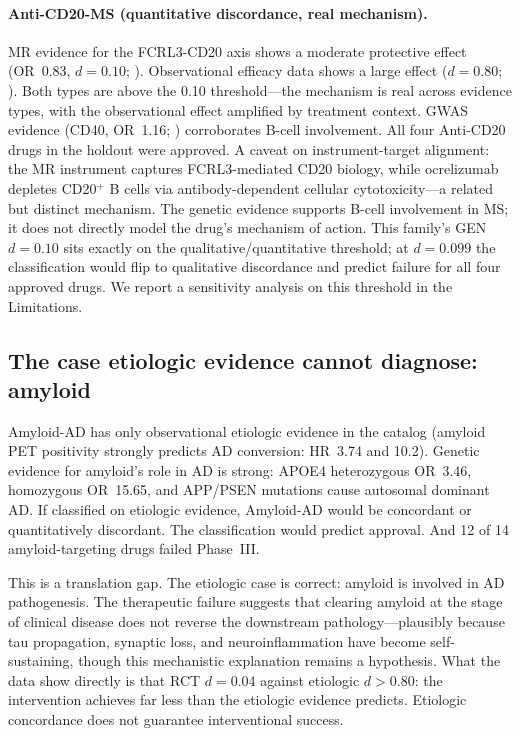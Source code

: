 \documentclass[11pt]{article}
\begin{document}
\paragraph{Anti-CD20-MS (quantitative discordance, real mechanism).} MR evidence for the FCRL3-CD20 axis shows a moderate protective effect (OR~0.83, $d = 0.10$; \citealp{lin2023}). Observational efficacy data shows a large effect ($d = 0.80$; \citealp{hu2019}). Both types are above the 0.10 threshold---the mechanism is real across evidence types, with the observational effect amplified by treatment context. GWAS evidence (CD40, OR~1.16; \citealp{sokolova2013}) corroborates B-cell involvement. All four Anti-CD20 drugs in the holdout were approved. A caveat on instrument-target alignment: the MR instrument captures FCRL3-mediated CD20 biology, while ocrelizumab depletes CD20$^+$ B cells via antibody-dependent cellular cytotoxicity---a related but distinct mechanism. The genetic evidence supports B-cell involvement in MS; it does not directly model the drug's mechanism of action. This family's GEN $d = 0.10$ sits exactly on the qualitative/quantitative threshold; at $d = 0.099$ the classification would flip to qualitative discordance and predict failure for all four approved drugs. We report a sensitivity analysis on this threshold in the Limitations.

\subsection{The case etiologic evidence cannot diagnose: amyloid}
\label{sec:amyloid}

Amyloid-AD has only observational etiologic evidence in the catalog (amyloid PET positivity strongly predicts AD conversion: HR~3.74 and 10.2). Genetic evidence for amyloid's role in AD is strong: APOE4 heterozygous OR~3.46, homozygous OR~15.65, and APP/PSEN mutations cause autosomal dominant AD. If classified on etiologic evidence, Amyloid-AD would be concordant or quantitatively discordant. The classification would predict approval. And 12 of 14 amyloid-targeting drugs failed Phase~III.

This is a translation gap. The etiologic case is correct: amyloid is involved in AD pathogenesis. The therapeutic failure suggests that clearing amyloid at the stage of clinical disease does not reverse the downstream pathology---plausibly because tau propagation, synaptic loss, and neuroinflammation have become self-sustaining, though this mechanistic explanation remains a hypothesis. What the data show directly is that RCT $d = 0.04$ against etiologic $d > 0.80$: the intervention achieves far less than the etiologic evidence predicts. Etiologic concordance does not guarantee interventional success.
\end{document}
